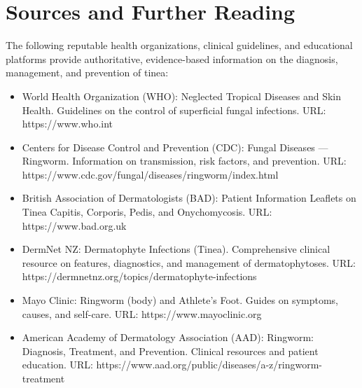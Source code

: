 \section*{Sources and Further Reading}
The following reputable health organizations, clinical guidelines, and educational platforms provide authoritative, evidence-based information on the diagnosis, management, and prevention of tinea:

\begin{itemize}
    \item World Health Organization (WHO): Neglected Tropical Diseases and Skin Health. Guidelines on the control of superficial fungal infections. URL: https://www.who.int
    \item Centers for Disease Control and Prevention (CDC): Fungal Diseases — Ringworm. Information on transmission, risk factors, and prevention. URL: https://www.cdc.gov/fungal/diseases/ringworm/index.html
    \item British Association of Dermatologists (BAD): Patient Information Leaflets on Tinea Capitis, Corporis, Pedis, and Onychomycosis. URL: https://www.bad.org.uk
    \item DermNet NZ: Dermatophyte Infections (Tinea). Comprehensive clinical resource on features, diagnostics, and management of dermatophytoses. URL: https://dermnetnz.org/topics/dermatophyte-infections
    \item Mayo Clinic: Ringworm (body) and Athlete's Foot. Guides on symptoms, causes, and self-care. URL: https://www.mayoclinic.org
    \item American Academy of Dermatology Association (AAD): Ringworm: Diagnosis, Treatment, and Prevention. Clinical resources and patient education. URL: https://www.aad.org/public/diseases/a-z/ringworm-treatment
\end{itemize}
